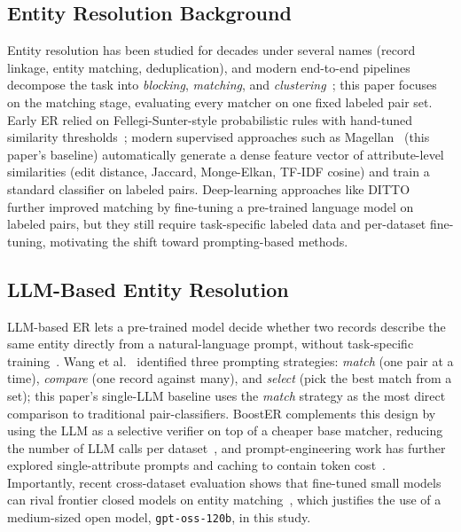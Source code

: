\documentclass[sigconf]{acmart}
\begin{document}
\subsection{Entity Resolution Background}
Entity resolution has been studied for decades under several names (record linkage, entity matching, deduplication), and modern end-to-end pipelines decompose the task into \textit{blocking}, \textit{matching}, and \textit{clustering}~\cite{binette2022almost, christophides2020overview}; this paper focuses on the matching stage, evaluating every matcher on one fixed labeled pair set.
Early ER relied on Fellegi-Sunter-style probabilistic rules with hand-tuned similarity thresholds~\cite{hussein2025llm}; modern supervised approaches such as Magellan~\cite{konda2016magellan} (this paper's baseline) automatically generate a dense feature vector of attribute-level similarities (edit distance, Jaccard, Monge-Elkan, TF-IDF cosine) and train a standard classifier on labeled pairs.
Deep-learning approaches like DITTO~\cite{li2020deep} further improved matching by fine-tuning a pre-trained language model on labeled pairs, but they still require task-specific labeled data and per-dataset fine-tuning, motivating the shift toward prompting-based methods.

\subsection{LLM-Based Entity Resolution}
LLM-based ER lets a pre-trained model decide whether two records describe the same entity directly from a natural-language prompt, without task-specific training~\cite{hussein2025llm}.
Wang et al.~\cite{wang2025match} identified three prompting strategies: \textit{match} (one pair at a time), \textit{compare} (one record against many), and \textit{select} (pick the best match from a set); this paper's single-LLM baseline uses the \textit{match} strategy as the most direct comparison to traditional pair-classifiers.
BoostER complements this design by using the LLM as a selective verifier on top of a cheaper base matcher, reducing the number of LLM calls per dataset~\cite{li2024booster}, and prompt-engineering work has further explored single-attribute prompts and caching to contain token cost~\cite{nananukul2024cost}.
Importantly, recent cross-dataset evaluation shows that fine-tuned small models can rival frontier closed models on entity matching~\cite{zhang2025deep}, which justifies the use of a medium-sized open model, \texttt{gpt-oss-120b}, in this study.
\end{document}

